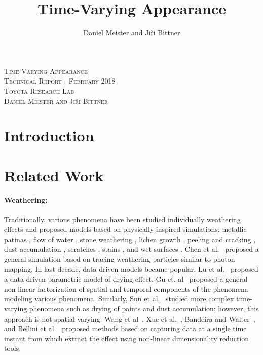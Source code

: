 \documentclass[11pt]{article}
\author{Daniel Meister and Ji\v{r}i Bittner}
\title{Time-Varying Appearance}
\begin{document}
\begin{center}
\textsc{\LARGE Time-Varying Appearance}\\[0.4cm]
\textsc{\Large Technical Report - February 2018}\\[0.4cm]
\textsc{\large Toyota Research Lab}\\[0.4cm]
\textsc{\normalsize Daniel Meister and Ji\v{r}i Bittner}\\[0.5cm]
\end{center}

\section{Introduction}

\section{Related Work}

\paragraph{Weathering:} Traditionally, various phenomena have been studied individually weathering effects and proposed models based on physically inspired simulations: metallic patinas \cite{Dorsey1996a}, flow of water \cite{Dorsey1996b}, stone weathering \cite{Dorsey1999,Xue2011}, lichen growth \cite{Desbenoit2004}, peeling and cracking \cite{Paquette2002}, dust accumulation \cite{Hsu1995}, scratches \cite{Bosch2004}, stains \cite{Bosch2011}, and wet surfaces \cite{Nakamae1990,Jensen1999}. Chen et al.~\cite{Chen2005} proposed a general simulation based on tracing weathering particles similar to photon mapping. In last decade, data-driven models became popular. Lu et al.~\cite{Lu2006} proposed a data-driven parametric model of drying effect. Gu et. al~\cite{Gu2006} proposed a general non-linear factorization of spatial and temporal components of the phenomena modeling various phenomena. Similarly, Sun et al.~\cite{Sun2007} studied more complex time-varying phenomena such as drying of paints and dust accumulation; however, this approach is not spatial varying. Wang et al~\cite{Wang2006}, Xue et al.~\cite{Xue2008}, Bandeira and Walter~\cite{Bandeira2009}, and Bellini et al.~\cite{Bellini2016} proposed methods based on capturing data at a single time instant from which extract the effect using non-linear dimensionality reduction tools.

\end{document}
